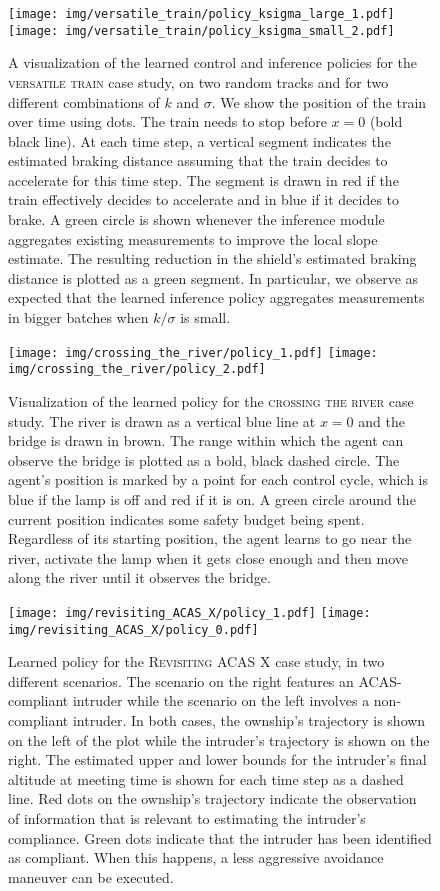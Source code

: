 \documentclass[acmsmall,screen,nonacm]{acmart}
\begin{document}
\begin{figure}
  \texttt{[image: img/versatile\_train/policy\_ksigma\_large\_1.pdf]}
  \hskip 15pt
  \texttt{[image: img/versatile\_train/policy\_ksigma\_small\_2.pdf]}
  \caption{A visualization of the learned control and inference policies for the \textsc{versatile train} case study, on two random tracks and for two different combinations of $k$ and $\sigma$. We show the position of the train over time using dots. The train needs to stop before $x=0$ (bold black line). At each time step, a vertical segment indicates the estimated braking distance assuming that the train decides to accelerate for this time step. The segment is drawn in red if the train effectively decides to accelerate and in blue if it decides to brake. A green circle is shown whenever the inference module aggregates existing measurements to improve the local slope estimate. The resulting reduction in the shield's estimated braking distance is plotted as a green segment. In particular, we observe as expected that the learned inference policy aggregates measurements in bigger batches when $k/\sigma$ is small.}
  \label{fig:example2-2}
  \Description[]{}
\end{figure}

\begin{figure}
  \texttt{[image: img/crossing\_the\_river/policy\_1.pdf]}
  \hskip 15pt
  \texttt{[image: img/crossing\_the\_river/policy\_2.pdf]}
  \caption{Visualization of the learned policy for the \textsc{crossing the river} case study. The river is drawn as a vertical blue line at $x=0$ and the bridge is drawn in brown. The range within which the agent can observe the bridge is plotted as a bold, black dashed circle. The agent's position is marked by a point for each control cycle, which is blue if the lamp is off and red if it is on. A green circle around the current position indicates some safety budget being spent. Regardless of its starting position, the agent learns to go near the river, activate the lamp when it gets close enough and then move along the river until it observes the bridge.}
  \label{fig:example3-2}
  \Description[]{}
\end{figure}

\begin{figure}
  \texttt{[image: img/revisiting\_ACAS\_X/policy\_1.pdf]}
  \hskip 15pt
  \texttt{[image: img/revisiting\_ACAS\_X/policy\_0.pdf]}
  \caption{Learned policy for the \textsc{Revisiting ACAS X} case study, in two different scenarios. The scenario on the right features an ACAS-compliant intruder while the scenario on the left involves a non-compliant intruder. In both cases, the ownship's trajectory is shown on the left of the plot while the intruder's trajectory is shown on the right. The estimated upper and lower bounds for the intruder's final altitude at meeting time is shown for each time step as a dashed line. Red dots on the ownship's trajectory indicate the observation of information that is relevant to estimating the intruder's compliance. Green dots indicate that the intruder has been identified as compliant. When this happens, a less aggressive avoidance maneuver can be executed.}
  \label{fig:example4-2}
  \Description[]{}
\end{figure}
\end{document}
